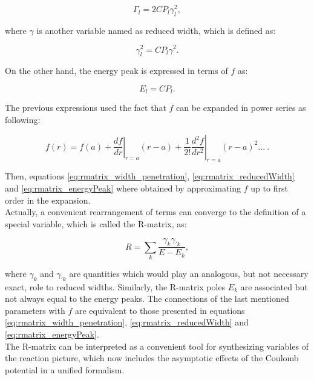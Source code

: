 \documentclass[openany]{book}
\begin{document}
\begin{equation}   \label{eq:rmatrix_width_penetration}
	\Gamma_l = 2CP_l\gamma^2_l,
\end{equation}

where $\gamma$ is another variable named as reduced width,  which is defined as: 

\begin{equation}   \label{eq:rmatrix_reducedWidth}
	\gamma^2_l =C P_l\gamma^2.
\end{equation}

On the other hand, the energy peak is expressed in terms of $f$ as: 

\begin{equation}  \label{eq:rmatrix_energyPeak}
	E_l =  C P_l.
\end{equation}

The previous expressions used the fact that $f$ can be expanded in power series as following: 

\begin{equation}   \label{eq:rmatrix_f_powerSeries}
	f(r) = f(a) + \left.\frac{df}{dr}\right|_{r = a} (r - a) +  \frac{1}{2!} \left.\frac{d^2f}{dr^2}\right|_{r = a} (r - a )^2  ... \ .
\end{equation}

Then, equations \ref{eq:rmatrix_width_penetration},     \ref{eq:rmatrix_reducedWidth} and \ref{eq:rmatrix_energyPeak} where obtained by approximating $f$ up to first order in the expansion.\\

Actually, a convenient rearrangement of terms can converge to the definition of a special variable, which is called the R-matrix, as: 

\begin{equation}  \label{eq:rmatrix_definition1}
	R= \sum_k {\frac{\gamma_{k} \gamma_{'k}}{E - E_k}}, 
\end{equation}

where $\gamma_{k} $ and $\gamma_{'k}$ are quantities which would play an analogous, but not necessary exact, role to reduced widths. Similarly, the R-matrix poles $E_k$ are associated but not always equal to the energy peaks. The connections of the last mentioned parameters with $f$ are equivalent to those presented in equations \ref{eq:rmatrix_width_penetration},     \ref{eq:rmatrix_reducedWidth} and \ref{eq:rmatrix_energyPeak}.   \\

The R-matrix can be interpreted as a convenient tool for synthesizing variables of the reaction picture, which now includes the asymptotic effects of the Coulomb potential in a unified formalism. \\
\end{document}
